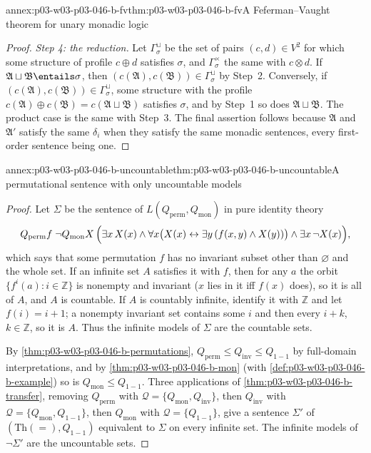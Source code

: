 \begin{annexitem}{annex:p03-w03-p03-046-b-fv}{thm:p03-w03-p03-046-b-fv}{A Feferman--Vaught theorem for unary monadic logic}
\begin{proof}
\emph{Step 4: the reduction.} Let \(\Gamma^\sqcup_\sigma\) be the set of
pairs \((c,d)\in V^2\) for which some structure of profile \(c\oplus d\)
satisfies \(\sigma\), and \(\Gamma^\times_\sigma\) the same with
\(c\otimes d\). If \(\mathfrak A\sqcup\mathfrak B\entails\sigma\), then
\((c(\mathfrak A),c(\mathfrak B))\in\Gamma^\sqcup_\sigma\) by Step~2.
Conversely, if \((c(\mathfrak A),c(\mathfrak B))\in\Gamma^\sqcup_\sigma\),
some structure with the profile \(c(\mathfrak A)\oplus c(\mathfrak
B)=c(\mathfrak A\sqcup\mathfrak B)\) satisfies \(\sigma\), and by Step~1 so
does \(\mathfrak A\sqcup\mathfrak B\). The product case is the same with
Step~3. The final assertion follows because \(\mathfrak A\) and
\(\mathfrak A'\) satisfy the same \(\delta_i\) when they satisfy the same
monadic sentences, every first-order sentence being one.
\end{proof}
\end{annexitem}

\begin{annexitem}{annex:p03-w03-p03-046-b-uncountable}{thm:p03-w03-p03-046-b-uncountable}{A permutational sentence with only uncountable models}
\begin{proof}
Let \(\Sigma\) be the sentence of \(L(Q_{\mathrm{perm}},Q_{\mathrm{mon}})\)
in pure identity theory
\[
Q_{\mathrm{perm}}f\;\neg Q_{\mathrm{mon}}X\,\Bigl(\exists x\,X(x)\wedge
\forall x\bigl(X(x)\leftrightarrow\exists y\,(f(x,y)\wedge X(y))\bigr)\wedge
\exists x\,\neg X(x)\Bigr),
\]
which says that some permutation \(f\) has no invariant subset other than
\(\varnothing\) and the whole set. If an infinite set \(A\) satisfies it
with \(f\), then for any \(a\) the orbit \(\{f^i(a):i\in\mathbb Z\}\) is
nonempty and invariant (\(x\) lies in it iff \(f(x)\) does), so it is all
of \(A\), and \(A\) is countable. If \(A\) is countably infinite, identify
it with \(\mathbb Z\) and let \(f(i)=i+1\); a nonempty invariant set
contains some \(i\) and then every \(i+k\), \(k\in\mathbb Z\), so it is
\(A\). Thus the infinite models of \(\Sigma\) are the countable sets.

By \cref{thm:p03-w03-p03-046-b-permutations}, \(Q_{\mathrm{perm}}\le
Q_{\mathrm{inv}}\le Q_{1-1}\) by full-domain interpretations, and by
\cref{thm:p03-w03-p03-046-b-mon} (with
\cref{def:p03-w03-p03-046-b-example}) so is \(Q_{\mathrm{mon}}\le
Q_{1-1}\). Three applications of
\cref{thm:p03-w03-p03-046-b-transfer}, removing \(Q_{\mathrm{perm}}\) with
\(\mathcal Q=\{Q_{\mathrm{mon}},Q_{\mathrm{inv}}\}\), then
\(Q_{\mathrm{inv}}\) with \(\mathcal Q=\{Q_{\mathrm{mon}},Q_{1-1}\}\), then
\(Q_{\mathrm{mon}}\) with \(\mathcal Q=\{Q_{1-1}\}\), give a sentence
\(\Sigma'\) of \((\mathrm{Th}(=),Q_{1-1})\) equivalent to \(\Sigma\) on every
infinite set. The infinite models of \(\neg\Sigma'\) are the uncountable
sets.
\end{proof}
\end{annexitem}

